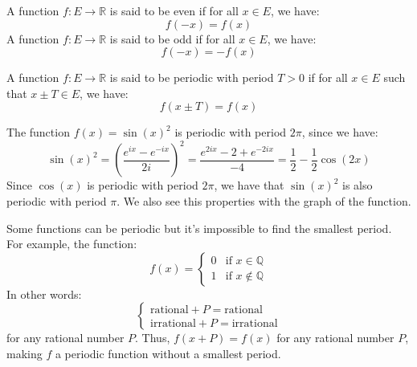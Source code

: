 \begin{definition}
    A function $f : E \to \mathbb{R}$ is said to be even if for all $x \in E$, we have:
    \[
        f(-x) = f(x)
    \]
    A function $f : E \to \mathbb{R}$ is said to be odd if for all $x \in E$, we have:
    \[
        f(-x) = -f(x)
    \]
\end{definition}

\begin{definition}
    A function $f : E \to \mathbb{R}$ is said to be periodic with period $T > 0$ if for all $x \in E$ such that $x \pm T \in E$, we have:
    \[
        f(x \pm T) = f(x)
    \]
\end{definition}
\begin{eg}
    The function $f(x) = \sin(x)^2$ is periodic with period $2\pi$, since we have:
    \[
        \sin(x)^2 = \left(\frac{e^{ix} - e^{-ix}}{2i}\right)^2 = \frac{e^{2ix} - 2 + e^{-2ix}}{-4} = \frac{1}{2} - \frac{1}{2}\cos(2x)
    \]
    Since $\cos(x)$ is periodic with period $2\pi$, we have that $\sin(x)^2$ is also periodic with period $\pi$.
    We also see this properties with the graph of the function.
    \begin{center}
    \end{center}
\end{eg}
\begin{eg}
    Some functions can be periodic but it's impossible to find the smallest period. For example, the function:
    \[
        f(x) = \begin{cases}
            0 & \text{if } x \in \mathbb{Q} \\
            1 & \text{if } x \notin \mathbb{Q}
        \end{cases}
    \]
    In other words:
    \[
        \begin{cases}
            \text{rational} + P = \text{rational} \\
            \text{irrational} + P = \text{irrational}
        \end{cases}
    \]
    for any rational number $P$. Thus, $f(x + P) = f(x)$ for any rational number $P$, making $f$ a periodic function without a smallest period.
\end{eg}

